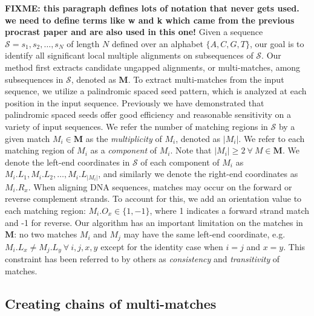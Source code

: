 \documentclass{ws-procs975x65}
\begin{document}
\textbf{FIXME:  this paragraph defines lots of notation that never gets used.  we need to define terms like w and k which came from the previous procrast paper and are also used in this one!}
Given a sequence $\mathcal{S}=s_1, s_2,\dots, s_N$ of length $N$
defined over an alphabet $\{A,C,G,T\}$, our goal is to identify all
significant local multiple alignments on subsequences of $\mathcal{S}$. Our
method first extracts candidate ungapped alignments, or multi-matches,
among subsequences in $\mathcal{S}$, denoted as $\mathbf{M}$. To extract multi-matches from the input sequence, we utilize a palindromic spaced seed pattern, which is analyzed at each position in the input sequence.  Previously we have demonstrated that palindromic spaced seeds offer good efficiency and reasonable sensitivity on a variety of input sequences\cite{ref-procrast}.
We refer the number of matching regions in $\mathcal{S}$
by a given match $M_i \in \mathbf{M}$ as the
\textit{multiplicity} of $M_i$, denoted as $|M_i|$. We refer to each
matching region of $M_i$ as a \textit{component} of $M_i$. Note that
$|M_i| \geq 2~\forall~M \in \mathbf{M}$.  We denote the left-end
coordinates in $\mathcal{S}$ of each component of $M_i$ as $M_i.L_1,
M_i.L_2,\dots, M_i.L_{|M_i|}$, and similarly we denote the right-end
coordinates as $M_i.R_x$.  When aligning DNA sequences, matches may
occur on the forward or reverse complement strands. To account for
this, we add an orientation value to each matching region:
$M_i.O_x \in \{1,-1\}$, where 1 indicates a forward strand match and
-1 for reverse. Our algorithm has an important limitation on the matches in
$\mathbf{M}$: no two matches $M_i$ and $M_j$ may have the same
left-end coordinate, e.g. $M_i.L_x \neq M_j.L_y~\forall~i, j, x, y$
except for the identity case when $i=j$ and $x=y$.  This constraint
has been referred to by others as \textit{consistency} and
\textit{transitivity}\cite{ref-transitivity} of matches.

\subsection{Creating chains of multi-matches}
\end{document}
